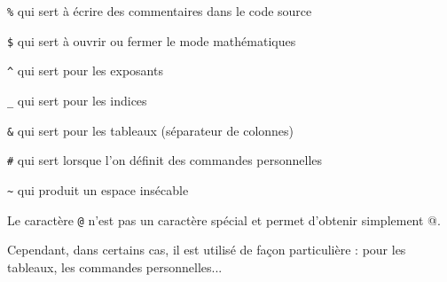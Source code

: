 \verb!%! qui sert à écrire des commentaires dans le code source

\verb!$! qui sert à ouvrir ou fermer le mode \og mathématiques\fg{}

\verb!^! qui sert pour les exposants

\verb!_! qui sert pour les indices

\verb!&! qui sert pour les tableaux (séparateur de colonnes)

\verb!#! qui sert lorsque l'on définit des commandes personnelles

\verb!~! qui produit un espace insécable


\begin{info}
	Le caractère \verb!@! n'est pas un caractère spécial et permet d'obtenir simplement @.\par
	Cependant, dans certains cas, il est utilisé de façon particulière : pour les tableaux, les commandes personnelles...
\end{info}


